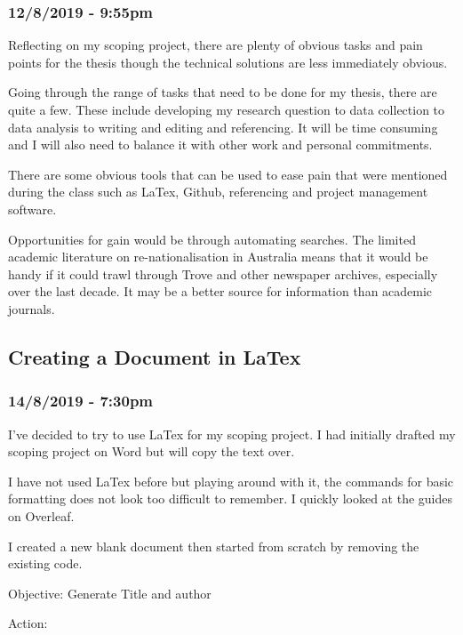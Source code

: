 \documentclass{article}
\begin{document}
\subsubsection*{12/8/2019 - 9:55pm}
Reflecting on my scoping project, there are plenty of obvious tasks and pain points for the thesis though the technical solutions are less immediately obvious.\par
Going through the range of tasks that need to be done for my thesis, there are quite a few. These include developing my research question to data collection to data analysis to writing and editing and referencing. It will be time consuming and I will also need to balance it with other work and personal commitments.\par
There are some obvious tools that can be used to ease pain that were mentioned during the class such as LaTex, Github, referencing and project management software.\par
Opportunities for gain would be through automating searches. The limited academic literature on re-nationalisation in Australia means that it would be handy if it could trawl through Trove and other newspaper archives, especially over the last decade. It may be a better source for information than academic journals.
\subsection{Creating a Document in LaTex}
\subsubsection*{14/8/2019 - 7:30pm}
I’ve decided to try to use LaTex for my scoping project. I had initially drafted my scoping project on Word but will copy the text over.\par
I have not used LaTex before but playing around with it, the commands for basic formatting does not look too difficult to remember. I quickly looked at the guides on Overleaf.\par
I created a new blank document then started from scratch by removing the existing code.\par
Objective: Generate Title and author\par
Action:
\end{document}
